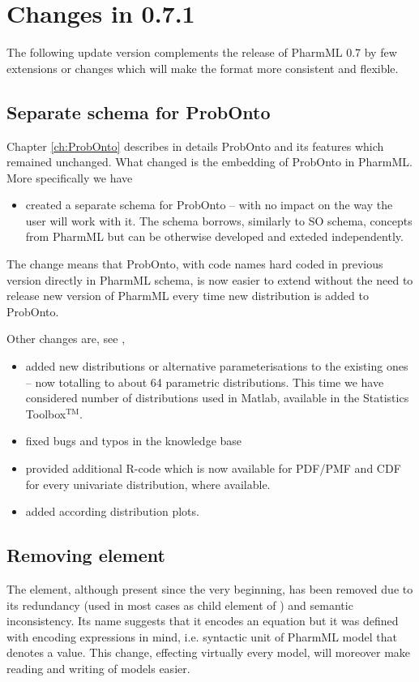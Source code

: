 
\chapter{Changes in 0.7.1}
\label{ch:071changes}
The following update version complements the release of PharmML 0.7 by
few extensions or changes which will make the format more consistent 
and flexible. 

\section{Separate schema for ProbOnto}
Chapter \ref{ch:ProbOnto} describes in details ProbOnto and its features 
which remained unchanged. What changed is the embedding of ProbOnto
in PharmML. More specifically we have 
\begin{itemize}
\item 
created a separate schema for ProbOnto -- with no impact on the way
the user will work with it. The schema borrows, similarly to SO schema, concepts
from PharmML but can be otherwise developed and exteded independently.
\end{itemize}
The change means that ProbOnto, with code names hard coded in previous 
version directly in PharmML schema, is now easier to extend without the need to 
release new version of PharmML every time new distribution is added 
to ProbOnto. 

Other changes are, see \cite{ProbOnto:2015a},
\begin{itemize}
\item 
added new distributions or alternative parameterisations to the existing ones -- now 
totalling to about 64 parametric distributions. This time we have considered number of
distributions used in Matlab, available in the Statistics Toolbox$^{\text{TM}}$.
\item 
fixed bugs and typos in the knowledge base
\item 
provided additional R-code which is now available for PDF/PMF and CDF for every 
univariate distribution, where available.
\item 
added according distribution plots.
\end{itemize}


\section{Removing  element}

The  element, although present since the very beginning, 
has been removed due to its redundancy (used in most cases as child 
element of ) and semantic inconsistency. Its name suggests 
that it encodes an equation but it was defined with encoding expressions in mind, 
i.e. syntactic unit of PharmML model that denotes a value. This change, 
effecting virtually every model, will moreover make reading and writing of 
models easier.

